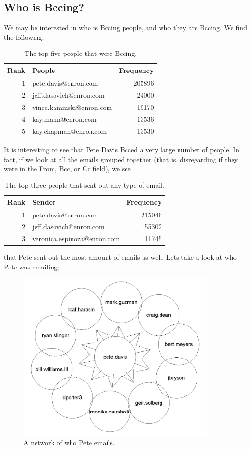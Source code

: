 \documentclass[12pt, a4paper, oneside]{amsart}
\begin{document}
\subsection{Who is Bccing?}
We may be interested in who is Bccing people, and who they are Bccing.  We find the following:
\begin{table}[ht]
\begin{center}
\begin{tabular}{|rlr|}
  \hline
 Rank & People & Frequency\\ 
  \hline
  1 & pete.davis@enron.com & 205896 \\ 
  2 & jeff.dasovich@enron.com & 24000 \\ 
  3 & vince.kaminski@enron.com & 19170 \\ 
  4 & kay.mann@enron.com & 13536 \\ 
  5 & kay.chapman@enron.com & 13530 \\ 
   \hline
\end{tabular}
\caption{The top five people that were Bccing.}
\label{table:allLibs}
\end{center}
\end{table}
It is interesting to see that Pete Davis Bcced a very large number of people.  In fact, if we look at all the emails grouped together (that is, disregarding if they were in the From, Bcc, or Cc field), we see
\begin{table}[ht]
\begin{center}
\begin{tabular}{|rlr|}
  \hline
 Rank & Sender & Frequency \\ 
  \hline
	1 & pete.davis@enron.com & 215046 \\ 
  2 & jeff.dasovich@enron.com & 155302 \\ 
  3 & veronica.espinoza@enron.com & 111745 \\ 
   \hline
\end{tabular}
\caption{The top three people that sent out any type of email.}
\label{table:allLibs}
\end{center}
\end{table}
that Pete sent out the most amount of emails as well.  Lets take a look at who Pete was emailing;
\begin{figure}[htp]
\centering
\includegraphics[width = 100mm]{PetePlot.jpeg}
\caption{A network of who Pete emails.}\label{fig:PeteNetwork}
\end{figure}\\
\end{document}
